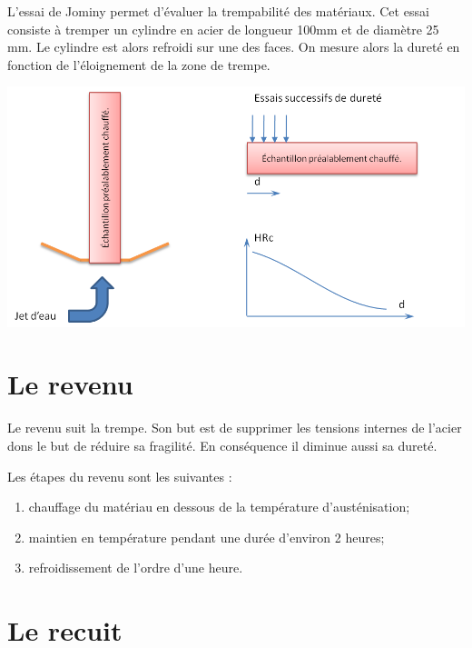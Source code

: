 \documentclass[11pt,oneside]{article}
\begin{document}
\begin{minipage}[c]{.5\linewidth}
L'essai de Jominy permet d'évaluer la trempabilité des matériaux. Cet essai consiste à tremper un cylindre en acier de longueur 100mm et de diamètre 25 mm. Le cylindre est alors refroidi sur une des faces. On mesure alors la dureté en fonction de l'éloignement de la zone de trempe. 
\end{minipage}\hfill
\begin{minipage}[c]{.45\linewidth}
\begin{center}
\includegraphics[width=\textwidth]{png/jominy}
\end{center}
\end{minipage}



\section{Le revenu}

\begin{obj}
Le revenu suit la trempe. Son but est
de supprimer les tensions internes de l'acier dons le but de réduire sa fragilité. En conséquence il diminue aussi sa dureté. 
\end{obj}

Les étapes du revenu sont les suivantes :
\begin{enumerate}
\item chauffage du matériau en dessous de la température d'austénisation;
\item maintien en température pendant une durée d'environ 2 heures;
\item refroidissement de l'ordre d'une heure.
\end{enumerate}

\section{Le recuit}
\end{document}

